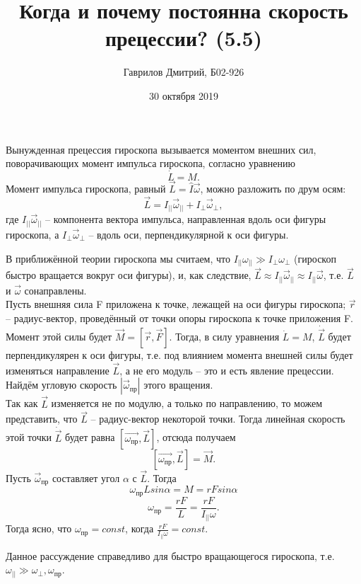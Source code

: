\documentclass[a4paper, 12pt]{article}
\title{Когда и почему постоянна скорость прецессии? (5.5)}
\author{Гаврилов Дмитрий, Б02-926}
\date{30 октября 2019}
\begin{document}
\maketitle

Вынужденная прецессия гироскопа вызывается моментом внешних сил, поворачивающих момент импульса гироскопа, согласно уравнению
$$
\dot L = M.
$$
Момент импульса гироскопа, равный $\vec{L} = \hat{I} \vec{\omega}$, можно разложить по друм осям:
$$
\vec{L} = I_{||} \vec{\omega}_{||} + I_{\perp} \vec{\omega}_{\perp},
$$
где $I_{||} \vec{\omega}_{||}$ -- компонента вектора импульса, направленная вдоль оси фигуры гироскопа, а $I_{\perp} \vec{\omega}_{\perp}$ -- вдоль оси, перпендикулярной к оси фигуры.

В приближённой теории гироскопа мы считаем, что $I_{||} \omega_{||} \gg I_{\perp} \omega_{\perp}$ (гироскоп быстро вращается вокруг оси фигуры), и, как следствие, $\vec{L} \approx I_{||} \vec{\omega}_{||} \approx I_{||} \vec{\omega}$, т.е. $\vec{L}$ и $\vec{\omega}$ сонаправлены.
\\
Пусть внешняя сила F приложена к точке, лежащей на оси фигуры гироскопа; $\vec{r}$ -- радиус-вектор, проведённый от точки опоры гироскопа к точке приложения F. Момент этой силы будет $\vec{M} = [\vec{r},\vec{F}]$. Тогда, в силу уравнения $\dot L = M$, $\dot{\vec{L}}$ будет перпендикулярен к оси фигуры, т.е. под влиянием момента внешней силы будет изменяться направление $\vec{L}$, а не его модуль -- это и есть явление прецессии. Найдём угловую скорость $|\vec{\omega}_{пр}|$ этого вращения.
\\
Так как $\vec{L}$ изменяется не по модулю, а только по направлению, то можем представить, что $\vec{L}$ -- радиус-вектор некоторой точки. Тогда линейная скорость этой точки $\dot{\vec{L}}$ будет равна $[\vec{\omega_{пр}}, \vec{L}]$, отсюда получаем
$$
[\vec{\omega_{пр}}, \vec{L}] = \vec{M}.
$$
Пусть $\vec{\omega}_{пр}$ составляет угол $\alpha$ с $\vec{L}$. Тогда
$$
\omega_{пр} L sin \alpha = M = r F sin \alpha
$$
$$
\omega_{пр} = \frac{r F}{L} = \frac{r F}{I_{||} \omega}.
$$
Тогда ясно, что $\omega_{пр} = const$, когда $\frac{r F}{I_{||} \omega} = const$.

Данное рассуждение справедливо для быстро вращающегося гироскопа, т.е. $\omega_{||} \gg \omega_{\perp}, \omega_{пр}$.
\end{document}
